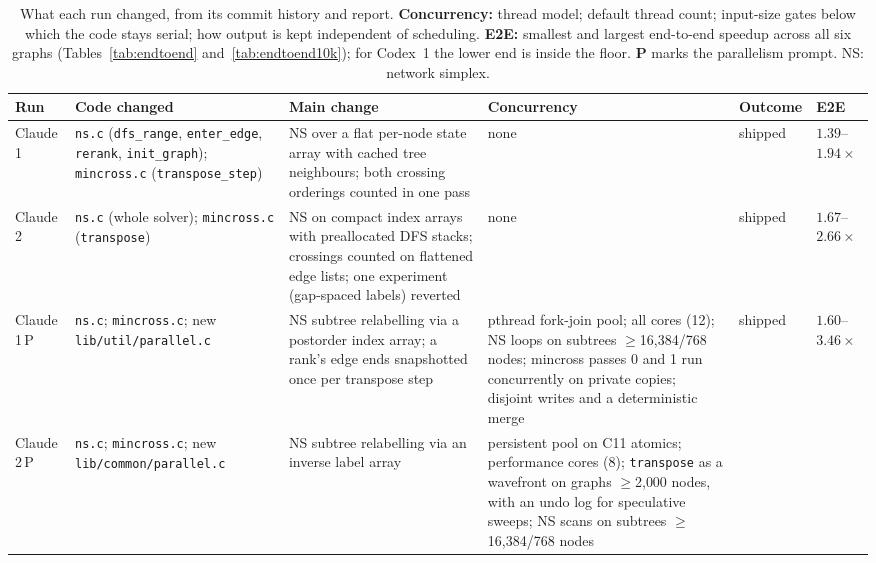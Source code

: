 \begin{table}[htbp]
\centering
\caption{What each run changed, from its commit history and report.
\textbf{Concurrency:} thread model; default thread count; input-size gates
below which the code stays serial; how output is kept independent of
scheduling. \textbf{E2E:} smallest and largest end-to-end speedup across all
six graphs (Tables~\ref{tab:endtoend} and~\ref{tab:endtoend10k}); for
Codex~1 the lower end is inside the floor. \textbf{P} marks the parallelism
prompt. NS: network simplex.}
\label{tab:changes}
\scriptsize
\setlength{\tabcolsep}{3pt}
\begin{tabular}{>{\raggedright\arraybackslash}p{1.1cm}
                >{\raggedright\arraybackslash}p{2.5cm}
                >{\raggedright\arraybackslash}p{3.0cm}
                >{\raggedright\arraybackslash}p{3.4cm}
                >{\raggedright\arraybackslash}p{1.5cm}
                >{\raggedright\arraybackslash}p{1.2cm}}
\toprule
\textbf{Run} & \textbf{Code changed} & \textbf{Main change} & \textbf{Concurrency} & \textbf{Outcome} & \textbf{E2E} \\
\midrule
Claude 1 &
\texttt{ns.c} (\texttt{dfs\_range}, \texttt{enter\_edge}, \texttt{rerank}, \texttt{init\_graph}); \texttt{mincross.c} (\texttt{transpose\_step}) &
NS over a flat per-node state array with cached tree neighbours; both crossing orderings counted in one pass &
none & shipped & $1.39$--$1.94\times$ \\
\addlinespace
Claude 2 &
\texttt{ns.c} (whole solver); \texttt{mincross.c} (\texttt{transpose}) &
NS on compact index arrays with preallocated DFS stacks; crossings counted on flattened edge lists; one experiment (gap-spaced labels) reverted &
none & shipped & $1.67$--$2.66\times$ \\
\addlinespace
Claude 1\,P &
\texttt{ns.c}; \texttt{mincross.c}; new \texttt{lib/\allowbreak util/\allowbreak parallel.c} &
NS subtree relabelling via a postorder index array; a rank's edge ends snapshotted once per transpose step &
pthread fork-join pool; all cores (12); NS loops on subtrees $\geq$16{,}384/\allowbreak 32{,}768 nodes; mincross passes 0 and 1 run concurrently on private copies; disjoint writes and a deterministic merge &
shipped & $1.60$--$3.46\times$ \\
\addlinespace
Claude 2\,P &
\texttt{ns.c}; \texttt{mincross.c}; new \texttt{lib/\allowbreak common/\allowbreak parallel.c} &
NS subtree relabelling via an inverse label array &
persistent pool on C11 atomics; performance cores (8); \texttt{transpose} as a wavefront on graphs $\geq$2{,}000 nodes, with an undo log for speculative sweeps; NS scans on subtrees $\geq$16{,}384/\allowbreak 32{,}768 nodes &

\end{tabular}
\end{table}

